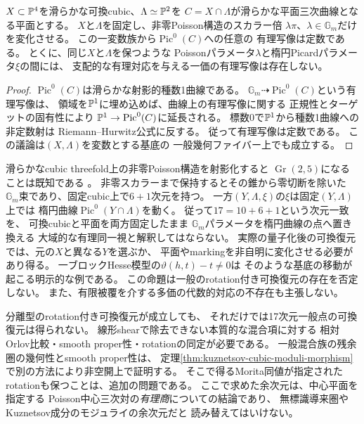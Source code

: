 \begin{proposition}[PoissonスカラーをPicardパラメータと直接同一視できない]\label{prop:poisson-picard-obstruction}
$X\subset\mathbb P^4$を滑らかな可換cubic、$\Lambda\simeq\mathbb P^2$を
$C=X\cap\Lambda$が滑らかな平面三次曲線となる平面とする。
$X$と$\Lambda$を固定し、非零Poisson構造のスカラー倍
$\lambda\pi$、$\lambda\in\mathbb G_m$だけを変化させる。
この一変数族から$\operatorname{Pic}^0(C)$への任意の
有理写像は定数である。
とくに、同じ$X$と$\Lambda$を保つような
Poissonパラメータ$\lambda$と楕円Picardパラメータ$\xi$の間には、
支配的な有理対応を与える一価の有理写像は存在しない。
\end{proposition}
\begin{proof}
$\operatorname{Pic}^0(C)$は滑らかな射影的種数1曲線である。
$\mathbb G_m\dashrightarrow\operatorname{Pic}^0(C)$という有理写像は、
領域を$\mathbb P^1$に埋め込めば、曲線上の有理写像に関する
正規性とターゲットの固有性により
$\mathbb P^1\to\operatorname{Pic}^0(C)$に延長される。
標数0で$\mathbb P^1$から種数1曲線への非定数射は
Riemann--Hurwitz公式に反する。
従って有理写像は定数である。
この議論は$(X,\Lambda)$を変数とする基底の
一般幾何ファイバー上でも成立する。
\end{proof}
\begin{remark}[復元に必要な非自明な幾何変化]\label{rem:picard-obstruction-scope}
滑らかなcubic threefold上の非零Poisson構造を射影化すると
$\operatorname{Gr}(2,5)$になることは既知である
\cite{LPT,Mayanskiy}。
非零スカラーまで保持するとその錐から零切断を除いた
$\mathbb G_m$束であり、固定cubic上で$6+1$次元を持つ。
一方$(Y,\Lambda,\xi)$の$\xi$は固定$(Y,\Lambda)$上では
楕円曲線$\operatorname{Pic}^0(Y\cap\Lambda)$を動く。
従って$17=10+6+1$という次元一致を、
可換cubicと平面を両方固定したまま
$\mathbb G_m$パラメータを楕円曲線の点へ置き換える
大域的な有理同一視と解釈してはならない。
実際の量子化後の可換復元では、元の$X$と異なる$Y$を選ぶか、
平面やmarkingを非自明に変化させる必要があり得る。
一ブロックHesse模型の$\vartheta(h,t)-t\ne0$は
そのような基底の移動が起こる明示的な例である。
この命題は一般のrotation付き可換復元の存在を否定しない。
また、有限被覆を介する多価の代数的対応の不存在も主張しない。
\end{remark}

\begin{remark}[可換復元への帰結]
\label{rem:split-implication}
分離型のrotation付き可換復元が成立しても、
それだけでは17次元一般点の可換復元は得られない。
線形shearで除去できない本質的な混合項に対する
相対Orlov比較・smooth proper性・rotationの同定が必要である。
一般混合族の残余圏の幾何性とsmooth proper性は、
定理\ref{thm:kuznetsov-cubic-moduli-morphism}で別の方法により非空開上で証明する。
そこで得るMorita同値が指定されたrotationも保つことは、追加の問題である。
ここで求めた余次元は、中心平面を指定する
Poisson中心三次対の\emph{有理商}についての結論であり、
無標識導来圏やKuznetsov成分のモジュライの余次元だと
読み替えてはいけない。
\end{remark}
